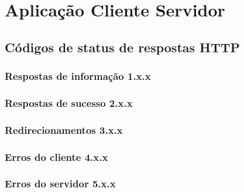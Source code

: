 \chapter{Aplicação Cliente Servidor}

\section{Códigos de status de respostas HTTP}
\subsection{Respostas de informação 1.x.x}
\subsection{Respostas de sucesso 2.x.x}
\subsection{Redirecionamentos 3.x.x}
\subsection{Erros do cliente 4.x.x}
\subsection{Erros do servidor 5.x.x}
